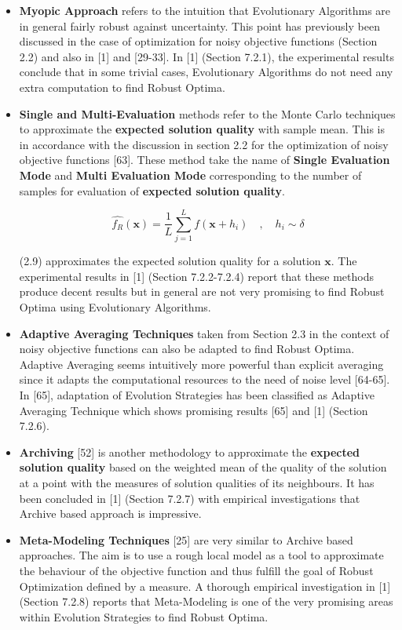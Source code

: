 \begin{itemize}
	\item \textbf{Myopic Approach} refers to the intuition that Evolutionary Algorithms are in general fairly robust against uncertainty. This point has previously been discussed in the case of optimization for noisy objective functions (Section 2.2) and also in [1] and [29-33]. In [1] (Section 7.2.1), the experimental results conclude that in some trivial cases, Evolutionary Algorithms do not need any extra computation to find Robust Optima. 
	
	\item \textbf{Single and Multi-Evaluation} methods refer to the Monte Carlo techniques to approximate the \textbf{expected solution quality} with sample mean. This is in accordance with the discussion in section 2.2 for the optimization of noisy objective functions [63]. These method take the name of \textbf{Single Evaluation Mode} and \textbf{Multi Evaluation Mode} corresponding to the number of samples for evaluation of \textbf{expected solution quality}. 
	
	\begin{equation}
    \hat{f_{R}}(\textbf{x}) = \frac{1}{L}  \sum_{j=1}^{L}  f(\textbf{x}+h_{i}) \quad , \quad h_{i} \sim \delta
    \end{equation}
    
    (2.9) approximates the expected solution quality for a solution $\textbf{x}$. The experimental results in [1] (Section 7.2.2-7.2.4) report that these methods produce decent results but in general are not very promising to find Robust Optima using Evolutionary Algorithms.   
	
	\item \textbf{Adaptive Averaging Techniques} taken from Section 2.3 in the context of noisy objective functions can also be adapted to find Robust Optima. Adaptive Averaging seems intuitively more powerful than explicit averaging since it adapts the computational resources to the need of noise level [64-65]. In [65], adaptation of Evolution Strategies has been classified as Adaptive Averaging Technique which shows promising results [65] and [1] (Section 7.2.6).   
	\item  \textbf{Archiving} [52] is another methodology to approximate the \textbf{expected solution quality} based on the weighted mean of the quality of the solution at a point with the measures of solution qualities of its neighbours. It has been concluded in [1] (Section 7.2.7) with empirical investigations that Archive based approach is impressive. 
	
	\item \textbf{Meta-Modeling Techniques} [25] are very similar to Archive based approaches. The aim is to use a rough local model as a tool to approximate the behaviour of the objective function and thus fulfill the goal of Robust Optimization defined by a measure. A thorough empirical investigation in [1] (Section 7.2.8) reports that Meta-Modeling is one of the very promising areas within Evolution Strategies to find Robust Optima.
	
\end{itemize}

